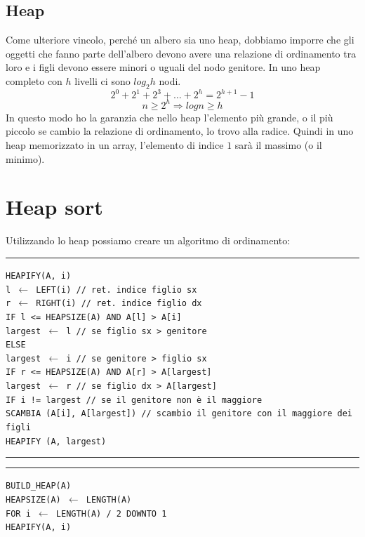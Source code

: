 \documentclass[a4paper,12pt,twoside]{report}
\newcommand\pseudo[1]{\setlength\parindent{0pt}\texttt{#1}\setlength\parindent{24pt} \\}
\newcommand\hlin{\noindent\rule[0.5ex]{\linewidth}{1pt}}
\newcommand\take[2]{#1 $\leftarrow$ #2}
\begin{document}
\subsection{Heap}

Come ulteriore vincolo, perch\'{e} un albero sia uno heap, dobbiamo imporre che gli oggetti che fanno parte dell'albero devono avere una relazione di ordinamento tra loro e i figli devono essere minori o uguali del nodo genitore. In uno heap completo con $h$ livelli ci sono $log_2h$ nodi.
\[ 2^0 + 2^1 + 2^3 + \dots + 2^h = 2^{h+1} -1 \]
\[n \ge 2^h \Rightarrow log n \ge h \]
In questo modo ho la garanzia che nello heap l'elemento pi\`{u} grande, o il pi\`{u} piccolo se cambio la relazione di ordinamento, lo trovo alla radice. Quindi in uno heap memorizzato in un array, l'elemento di indice $1$ sar\`{a} il massimo (o il minimo).
\newpage

\section{Heap sort}

Utilizzando lo heap possiamo creare un algoritmo di ordinamento:

\hlin

\pseudo{HEAPIFY(A, i)}
\texttt{\indent \take{l}{LEFT(i)} \indent // ret. indice figlio sx \\
\indent \take{r}{RIGHT(i)} \indent // ret. indice figlio dx \\ 
\indent IF l <= HEAPSIZE(A) AND A[l] > A[i] \\
\indent\indent \take{largest}{l}	\indent // se figlio sx > genitore \\
\indent ELSE  \\
\indent\indent \take{largest}{i} \indent // se genitore > figlio sx \\
\indent IF r <= HEAPSIZE(A) AND A[r] > A[largest] \\
\indent\indent \take{largest}{r} \indent // se figlio dx > A[largest] \\
\indent IF i != largest \indent // se il genitore non \`{e} il maggiore \\
\indent\indent SCAMBIA (A[i], A[largest]) \indent // scambio il genitore con il maggiore dei figli\\
\indent\indent HEAPIFY (A, largest) \\ 
}

\hlin

\hlin 

\pseudo{BUILD\_HEAP(A)}
\texttt{\indent \take{HEAPSIZE(A)}{LENGTH(A)} \\
\indent FOR \take{i}{LENGTH(A) / 2} DOWNTO 1 \\
\indent\indent HEAPIFY(A, i) \\
}
\end{document}
